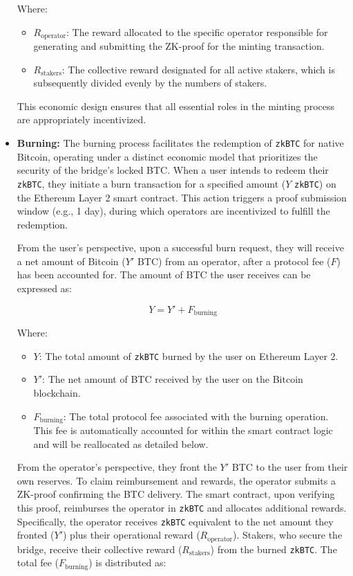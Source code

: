 \documentclass{DESSThesis}
\newcommand{\zktoken}{\texttt{zkBTC}}
\begin{document}
\begin{itemize}
    Where:
    \begin{itemize}
        \item \(R_{\text{operator}}\): The reward allocated to the specific operator responsible for generating and submitting the ZK-proof for the minting transaction.
        \item \(R_{\text{stakers}}\): The collective reward designated for all active stakers, which is subsequently divided evenly by the numbers of stakers.
    \end{itemize}
    This economic design ensures that all essential roles in the minting process are appropriately incentivized.

    \item \textbf{Burning:} The burning process facilitates the redemption of \texttt{\zktoken} for native Bitcoin, operating under a distinct economic model that prioritizes the security of the bridge's locked BTC. When a user intends to redeem their \texttt{\zktoken}, they initiate a burn transaction for a specified amount (\(Y\) \texttt{\zktoken}) on the Ethereum Layer 2 smart contract. This action triggers a proof submission window (e.g., 1 day), during which operators are incentivized to fulfill the redemption.

    From the user's perspective, upon a successful burn request, they will receive a net amount of Bitcoin (\(Y'\) BTC) from an operator, after a protocol fee (\(F\)) has been accounted for. The amount of BTC the user receives can be expressed as:

\begin{equation} \label{eq:burning_overall}
    Y = Y' + F_{\text{burning}}
\end{equation}

    Where:
    \begin{itemize}
        \item \(Y\): The total amount of \texttt{\zktoken} burned by the user on Ethereum Layer 2.
        \item \(Y'\): The net amount of BTC received by the user on the Bitcoin blockchain.
        \item \(F_{\text{burning}}\): The total protocol fee associated with the burning operation. This fee is automatically accounted for within the smart contract logic and will be reallocated as detailed below.
    \end{itemize}

    From the operator's perspective, they front the \(Y'\) BTC to the user from their own reserves. To claim reimbursement and rewards, the operator submits a ZK-proof confirming the BTC delivery. The smart contract, upon verifying this proof, reimburses the operator in \texttt{\zktoken} and allocates additional rewards. Specifically, the operator receives \texttt{\zktoken} equivalent to the net amount they fronted (\(Y'\)) plus their operational reward (\(R_{\text{operator}}\)). Stakers, who secure the bridge, receive their collective reward (\(R_{\text{stakers}}\)) from the burned \texttt{\zktoken}. The total fee (\(F_{\text{burning}}\)) is distributed as:


\end{itemize}
\end{document}
